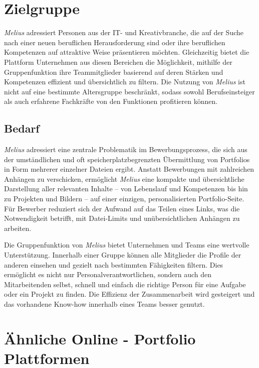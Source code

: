 
\section{Zielgruppe}

\textit{Melius} adressiert Personen aus der IT- und Kreativbranche, die auf der Suche nach einer neuen beruflichen Herausforderung sind oder ihre beruflichen Kompetenzen auf attraktive Weise präsentieren möchten. Gleichzeitig bietet die Plattform Unternehmen aus diesen Bereichen die Möglichkeit, mithilfe der Gruppenfunktion ihre Teammitglieder basierend auf deren Stärken und Kompetenzen effizient und übersichtlich zu filtern. Die Nutzung von \textit{Melius} ist nicht auf eine bestimmte Altersgruppe beschränkt, sodass sowohl Berufseinsteiger als auch erfahrene Fachkräfte von den Funktionen profitieren können.

\subsection{Bedarf}

\textit{Melius} adressiert eine zentrale Problematik im Bewerbungsprozess, die sich aus der umständlichen und oft speicherplatzbegrenzten Übermittlung von Portfolios in Form mehrerer einzelner Dateien ergibt. Anstatt Bewerbungen mit zahlreichen Anhängen zu verschicken, ermöglicht \textit{Melius} eine kompakte und übersichtliche Darstellung aller relevanten Inhalte – von Lebenslauf und Kompetenzen bis hin zu Projekten und Bildern – auf einer einzigen, personalisierten Portfolio-Seite. Für Bewerber reduziert sich der Aufwand auf das Teilen eines Links, was die Notwendigkeit betrifft, mit Datei-Limits und unübersichtlichen Anhängen zu arbeiten.

Die Gruppenfunktion von \textit{Melius} bietet Unternehmen und Teams eine wertvolle Unterstützung. Innerhalb einer Gruppe können alle Mitglieder die Profile der anderen einsehen und gezielt nach bestimmten Fähigkeiten filtern. Dies ermöglicht es nicht nur Personalverantwortlichen, sondern auch den Mitarbeitenden selbst, schnell und einfach die richtige Person für eine Aufgabe oder ein Projekt zu finden. Die Effizienz der Zusammenarbeit wird gesteigert und das vorhandene Know-how innerhalb eines Teams besser genutzt.

\section{Ähnliche Online - Portfolio Plattformen}

